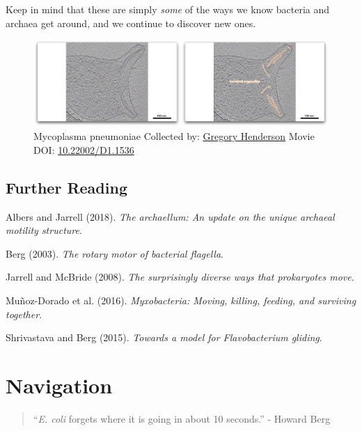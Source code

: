 \documentclass[]{tufte-book}
\begin{document}
Keep in mind that these are simply \emph{some} of the ways we know
bacteria and archaea get around, and we continue to discover new ones.





\begin{figure}
\includegraphics{movie_stills/6_12} \caption[Mycoplasma pneumoniae Collected by:
\protect\hyperlink{gregory_henderson}{Gregory Henderson} Movie DOI:
\href{https://doi.org/10.22002/D1.1536}{10.22002/D1.1536}]{Mycoplasma pneumoniae Collected by:
\protect\hyperlink{gregory_henderson}{Gregory Henderson} Movie DOI:
\href{https://doi.org/10.22002/D1.1536}{10.22002/D1.1536}}\label{fig:6-12}
\end{figure}

\section{Further Reading}\label{further-reading}

Albers and Jarrell (2018). \emph{The archaellum: An update on the unique
archaeal motility structure}.\citep{albers2018}

Berg (2003). \emph{The rotary motor of bacterial
flagella}.\citep{berg2003}

Jarrell and McBride (2008). \emph{The surprisingly diverse ways that
prokaryotes move}.\citep{jarrell2008}

Muñoz-Dorado et al. (2016). \emph{Myxobacteria: Moving, killing,
feeding, and surviving together}.\citep{munoz-dorado2016}

Shrivastava and Berg (2015). \emph{Towards a model for Flavobacterium
gliding}.\citep{shrivastava2015}

\chapter{Navigation}\label{navigation}

\begin{quote}
``\emph{E. coli} forgets where it is going in about 10 seconds.'' -
Howard Berg \citep{berg1988}
\end{quote}
\end{document}
